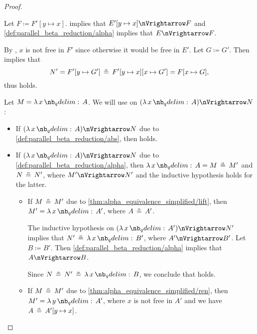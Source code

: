\begin{proof}
\begin{itemize}
\begin{itemize}
\begin{itemize}
        Let \( F \coloneqq F'[y \mapsto x] \).  implies that \( E'[y \mapsto x] \pred F \) and \ref{def:parallel_beta_reduction/alpha} implies that \( E \pred F \).

        By , \( x \) is not free in \( F' \) since otherwise it would be free in \( E' \). Let \( G \coloneqq G' \). Then  implies that
        \begin{equation*}
          N'
          =
          F'[y \mapsto G']
          \aequiv
          F'[y \mapsto x][x \mapsto G']
          =
          F[x \mapsto G],
        \end{equation*}
        thus  holds.
      \end{itemize}
    \end{itemize}
  \end{itemize}

   Let \( M = \qabs x A \). We will use  on \( (\qabs x A) \pred N \):
  \begin{itemize}
    \item If \( (\qabs x A) \pred N \) due to \ref{def:parallel_beta_reduction/abs}, then  holds.

    \item If \( (\qabs x A) \pred N \) due to \ref{def:parallel_beta_reduction/alpha}, then \( \qabs x A = M \aequiv M' \) and \( N \aequiv N' \), where \( M' \pred N' \) and the inductive hypothesis holds for the latter.

    \begin{itemize}
      \item If \( M \aequiv M' \) due to \ref{thm:alpha_equivalence_simplified/lift}, then \( M' = \qabs x A' \), where \( A \aequiv A' \).

      The inductive hypothesis on \( (\qabs x A') \pred N' \) implies that \( N' \aequiv \qabs x B' \), where \( A' \pred B' \). Let \( B \coloneqq B' \). Then \ref{def:parallel_beta_reduction/alpha} implies that \( A \pred B \).

      Since \( N \aequiv N' \aequiv \qabs x B \), we conclude that  holds.

      \item If \( M \aequiv M' \) due to \ref{thm:alpha_equivalence_simplified/ren}, then \( M' = \qabs y A' \), where \( x \) is not free in \( A' \) and we have \( A \aequiv A'[y \mapsto x] \).


\end{itemize}
\end{itemize}
\end{proof}

